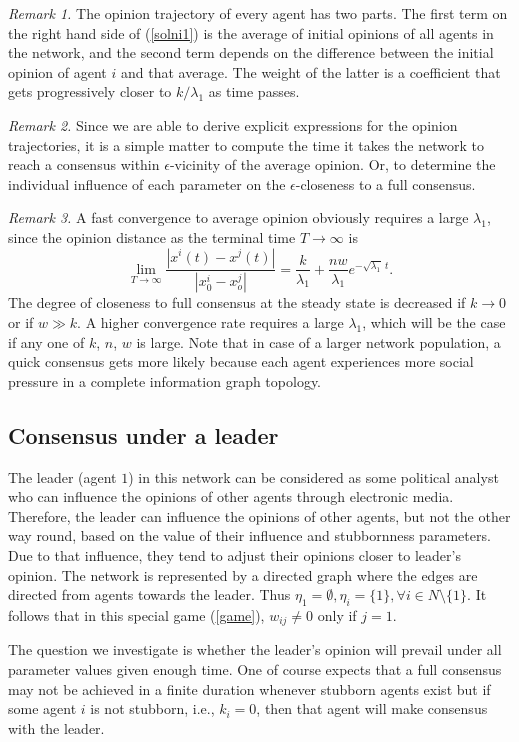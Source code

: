 \documentclass[10pt, conference, compsocconf]{IEEEtran}
\begin{document}
{\it Remark 1.} The opinion trajectory of every agent has two parts. The first term on the right hand side of (\ref{solni1}) is the average of initial opinions of all agents in the network, and the second term depends on the difference between the initial opinion of agent $i$ and that average. The weight of the latter is a coefficient that gets progressively closer to $k/\lambda_1$ as time passes.

{\it Remark 2.} Since we are able to derive explicit expressions for the opinion trajectories,  it is a simple matter to compute the time it takes the network to reach a consensus within $\epsilon$-vicinity of the average opinion. Or, to determine the individual influence of each parameter on the $\epsilon$-closeness to a full consensus.

{\it Remark 3.} A fast convergence to average opinion obviously requires a large $\lambda_1$, since the opinion distance as the terminal time $T\rightarrow \infty$ is
\[
	\lim_{T\rightarrow \infty} \frac{| x^i(t) - x^j(t)|}{|x_0^i - x_o^j|} = 
	\frac{k}{\lambda_1} + \frac{nw}{\lambda_1} e^{-\sqrt{\lambda_1} \ t} .
\]
The degree of closeness to full consensus at the steady state is decreased if $k\rightarrow 0$ or if $w \gg k$. A higher convergence rate requires a large $\lambda_1$, which will be the case if any one of $k$, $n$, $w$ is large. Note that in case of a larger network population, a quick consensus gets more likely because  each agent experiences more social pressure in a complete information graph topology.

\subsection{Consensus under a leader}

The leader (agent $1$) in this network can be considered as some political analyst who can influence the opinions of other agents through electronic media. Therefore, the leader can influence the opinions of other agents, but not the other way round, based on the value of their influence and stubbornness parameters. Due to that influence, they tend to adjust their opinions closer to leader's opinion. The network is represented by a directed graph where the edges are directed from agents towards the leader. Thus $\eta_1=\emptyset, \eta_i=\{1\}, \forall i\in N\setminus \{1\}$. It follows that 
in this special game (\ref{game}), $w_{ij}\neq 0$ only if $j=1$.

The question we investigate is whether the leader's opinion will prevail under all parameter values given enough time.
One of course expects that a full consensus may not be achieved in a finite duration whenever stubborn agents exist but if some agent $i$ is not stubborn, i.e., $k_i=0$, then that agent will make consensus with the leader.
\end{document}
